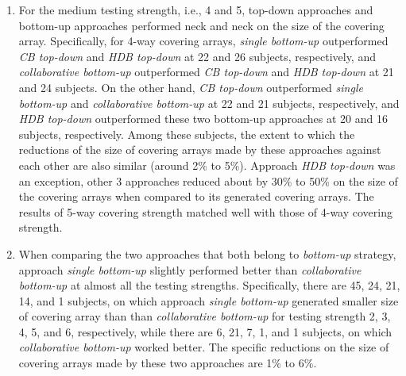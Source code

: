 \documentclass[conference]{IEEEtran}
\theoremstyle{definition}
\begin{document}
\begin{enumerate}
 \item  For the medium testing strength, i.e., 4 and 5, top-down approaches and bottom-up approaches performed neck and neck on the size of the covering array. Specifically, for 4-way covering arrays, \emph{single bottom-up} outperformed \emph{CB top-down} and \emph{HDB top-down} at 22 and 26 subjects, respectively, and \emph{collaborative bottom-up} outperformed \emph{CB top-down} and \emph{HDB top-down} at 21 and 24 subjects. On the other hand, \emph{CB top-down} outperformed \emph{single bottom-up} and \emph{collaborative bottom-up} at 22 and 21 subjects, respectively, and \emph{HDB top-down} outperformed these two bottom-up approaches at 20 and 16 subjects, respectively.  Among these subjects, the extent to which the reductions of the size of covering arrays made by these approaches against each other are also similar (around 2\% to 5\%). Approach \emph{HDB top-down} was an exception, other 3 approaches reduced about by 30\% to 50\% on the size of the covering arrays when compared to its generated covering arrays.  The results of 5-way covering strength matched well with those of 4-way covering strength.

    \item When comparing the two approaches that both belong to \emph{bottom-up} strategy, approach \emph{single bottom-up} slightly performed better than \emph{collaborative bottom-up} at almost all the testing strengths. Specifically, there are 45, 24, 21, 14, and 1 subjects, on which approach \emph{single bottom-up} generated smaller size of covering array than than \emph{collaborative bottom-up} for testing strength 2, 3, 4, 5, and 6, respectively, while there are 6, 21, 7, 1, and 1 subjects, on which \emph{collaborative bottom-up} worked better. The specific reductions on the size of covering arrays made by these two approaches are 1\% to 6\%.


\end{enumerate}
\end{document}
